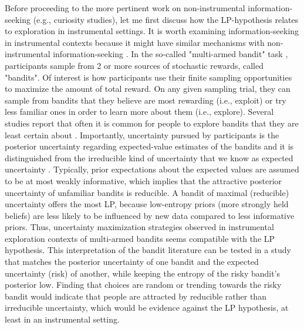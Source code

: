 Before proceeding to the more pertinent work on non-instrumental information-seeking (e.g., curiosity studies), let me first discuss how the \ac{LP}-hypothesis relates to exploration in instrumental settings. It is worth examining information-seeking in instrumental contexts because it might have similar mechanisms with non-instrumental information-seeking \parencite{gottlieb_towards_2018,gottlieb_curiosity_2020}. In the so-called "multi-armed bandit" task \parencite[see ][]{averbeck_theory_2015}, participants sample from 2 or more sources of stochastic rewards, called "bandits". Of interest is how participants use their finite sampling opportunities to maximize the amount of total reward. On any given sampling trial, they can sample from bandits that they believe are most rewarding (i.e., exploit) or try less familiar ones in order to learn more about them (i.e., explore). Several studies report that often it is common for people to explore bandits that they are least certain about \parencite{speekenbrink_uncertainty_2015,gershman_deconstructing_2018,schulz_structured_2019}. Importantly, uncertainty pursued by participants is the posterior uncertainty regarding expected-value estimates of the bandits and it is distinguished from the irreducible kind of uncertainty that we know as expected uncertainty \parencite{schulz_algorithmic_2019}. Typically, prior expectations about the expected values are assumed to be at most weakly informative, which implies that the attractive posterior uncertainty of unfamiliar bandits is reducible. A bandit of maximal (reducible) uncertainty offers the most \ac{LP}, because low-entropy priors (more strongly held beliefs) are less likely to be influenced by new data compared to less informative priors. Thus, uncertainty maximization strategies observed in instrumental exploration contexts of multi-armed bandits seems compatible with the \ac{LP} hypothesis. This interpretation of the bandit literature can be tested in a study that matches the posterior uncertainty of one bandit and the expected uncertainty (risk) of another, while keeping the entropy of the risky bandit's posterior low. Finding that choices are random or trending towards the risky bandit would indicate that people are attracted by reducible rather than irreducible uncertainty, which would be evidence against the \ac{LP} hypothesis, at least in an instrumental setting. 

